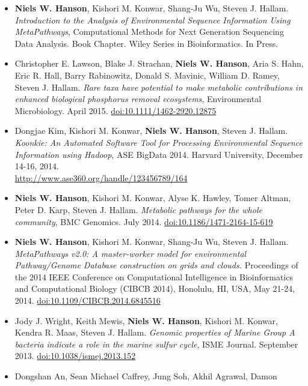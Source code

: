 \documentclass[print]{hanson_cv} %
\begin{document}
\begin{itemize}
\item
  \textbf{Niels W. Hanson}, Kishori M. Konwar, Shang-Ju Wu, Steven J. Hallam. \emph{Introduction to the Analysis of Environmental Sequence Information Using MetaPathways}, Computational Methods for Next Generation Sequencing Data Analysis. Book Chapter. Wiley Series in Bioinformatics. In Press.
\item
  Christopher E. Lawson, Blake J. Strachan, \textbf{Niels W. Hanson}, Aria S. Hahn, Eric R. Hall, Barry Rabinowitz, Donald S. Mavinic, William D. Ramey, Steven J. Hallam. \emph{Rare taxa have potential to make metabolic contributions in enhanced biological phosphorus removal ecosystems}, Environmental Microbiology. April 2015. \href{http://dx.doi.org/10.1111/1462-2920.12875}{doi:10.1111/1462-2920.12875} 
\item
  Dongjae Kim, Kishori M. Konwar, \textbf{Niels W. Hanson}, Steven J.
  Hallam. \emph{Koonkie: An Automated Software Tool for Processing
  Environmental Sequence Information using Hadoop}, ASE BigData 2014.
  Harvard University, December 14-16,
  2014.\\\href{http://www.ase360.org/handle/123456789/164}{http://www.ase360.org/handle/123456789/164}
\item
  \textbf{Niels W. Hanson}, Kishori M. Konwar, Alyse K. Hawley, Tomer
  Altman, Peter D. Karp, Steven J. Hallam. \emph{Metabolic pathways for
  the whole community}, BMC Genomics. July 2014.
  \href{http://dx.doi.org/10.1186/1471-2164-15-619}{doi:10.1186/1471-2164-15-619}
\item
  \textbf{Niels W. Hanson}, Kishori M. Konwar, Shang-Ju Wu, Steven J.
  Hallam. \emph{MetaPathways v2.0: A master-worker model for
  environmental Pathway/Genome Database construction on grids and
  clouds.} Proceedings of the 2014 IEEE Conference on Computational
  Intelligence in Bioinformatics and Computational Biology (CIBCB 2014),
  Honolulu, HI, USA, May 21-24, 2014.
  \href{http://ieeexplore.ieee.org/xpl/articleDetails.jsp?arnumber=6845516}{doi:10.1109/CIBCB.2014.6845516}
\item
  Jody J. Wright, Keith Mewis, \textbf{Niels W. Hanson}, Kishori M.
  Konwar, Kendra R. Maas, Steven J. Hallam. \emph{Genomic properties of
  Marine Group A bacteria indicate a role in the marine sulfur cycle},
  ISME Journal. September 2013.
  \href{http://dx.doi.org/10.1038/ismej.2013.152}{doi:10.1038/ismej.2013.152}
\item
  Dongshan An, Sean Michael Caffrey, Jung Soh, Akhil Agrawal, Damon

\end{itemize}
\end{document}
